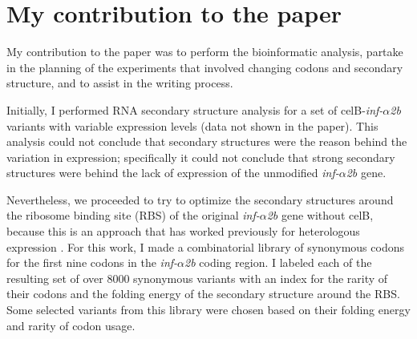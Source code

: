 \section{My contribution to the paper}
My contribution to the paper was to perform the bioinformatic analysis, partake
in the planning of the experiments that involved changing codons and secondary
structure, and to assist in the writing process.

Initially, I performed RNA secondary structure analysis for a set of
celB-\textit{inf-$\alpha$2b} variants with variable expression levels (data not
shown in the paper). This analysis could not conclude that secondary structures
were the reason behind the variation in expression; specifically it could not
conclude that strong secondary structures were behind the lack of expression of
the unmodified \textit{inf-$\alpha$2b} gene.

Nevertheless, we proceeded to try to optimize the secondary structures around
the ribosome binding site (RBS) of the original \textit{inf-$\alpha$2b} gene
without celB, because this is an approach that has worked previously for
heterologous expression \cite{de_smit_secondary_1990}. For this work, I made a
combinatorial library of synonymous codons for the first nine codons in the
\textit{inf-$\alpha$2b} coding region. I labeled each of the resulting set of
over 8000 synonymous variants with an index for the rarity of their codons and
the folding energy of the secondary structure around the RBS. Some selected
variants from this library were chosen based on their folding energy and rarity
of codon usage.
